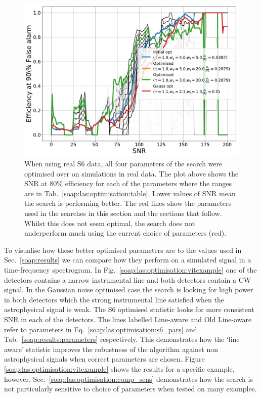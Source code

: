 \begin{figure}[p]
    \centering
    \includegraphics[width=\linewidth]{C3_soap/s6_optimised.pdf}
    \caption[Optimisation of line aware statistic in real S6 data.]{When using real S6 data, all four parameters of the search were optimised over on simulations in real data. The plot above shows the \gls{SNR} at 80\% efficiency for each of the parameters where the ranges are in Tab.~\ref{soap:las:optimisation:table}. Lower values of \gls{SNR} mean the search is performing better. The red lines show the parameters used in the searches in this section and the sections that follow. Whilst this does not seem optimal, the search does not underperform much using the current choice of parameters (red). }
    \label{soap:las:optimisation:s6mdc}
\end{figure}

To visualise how these better optimised parameters are to the values used in
Sec.~\ref{soap:results} we can compare how they perform on a simulated signal
in a time-frequency spectrogram. In Fig.~\ref{soap:las:optimisation:vitexample} one of the detectors contains a narrow instrumental line and both detectors contain a \gls{CW} signal.
In the Gaussian noise optimised case the search is looking for high power in both
detectors which the strong instrumental line satisfied when the astrophysical
signal is weak.  The S6 optimised statistic looks for more consistent \gls{SNR}
in each of the detectors.  The lines labelled Line-aware and Old Line-aware refer to parameters in Eq.~\ref{soap:las:optimisation:s6_pars} and Tab.~\ref{soap:results:parameters} respectively. 
This demonstrates how the `line aware' statistic improves the robustness of the
algorithm against non astrophysical signals when correct parameters are chosen.
Figure \ref{soap:las:optimisation:vitexample} shows the results for a specific example, however, Sec.~\ref{soap:las:optimisation:comp_sens} demonstrates how the search is not particularly sensitive to choice of parameters when tested on many examples. 

